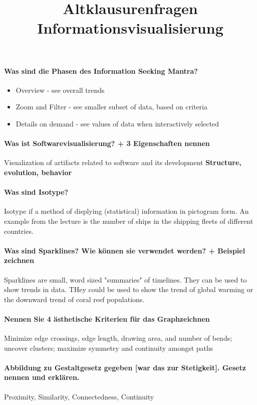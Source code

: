 \documentclass[10pt,a4paper]{article}
\title{Altklausurenfragen Informationsvisualisierung}
\begin{document}
	\maketitle
	\paragraph{Was sind die Phasen des Information Seeking Mantra?}
	\begin{itemize}
		\item Overview - see overall trends
		\item Zoom and Filter - see smaller subset of data, based on criteria
		\item Details on demand - see values of data when interactively selected
	\end{itemize}
	
	\paragraph{Was ist Softwarevisualisierung? + 3 Eigenschaften nennen}
	Visualization of artifacts related to software and its development
	\textbf{Structure, evolution, behavior}
	
	\paragraph{Was sind Isotype?} Isotype if a method of displying (statistical) information in pictogram form. An example from the lecture is the number of ships in the shipping fleets of different countries.
	
	\paragraph{Was sind Sparklines? Wie können sie verwendet werden? + Beispiel zeichnen}
	Sparklines are small, word sized "summaries" of timelines. They can be used to show trends in data. THey could be used to show the trend of global warming or the downward trend of coral reef populations.
	
	\paragraph{Nennen Sie 4 ästhetische Kriterien für das Graphzeichnen}
	Minimize edge crossings, edge length, drawing area, and number of bends; uncover clusters; maximize symmetry and continuity amongst paths
	
	
	\paragraph{Abbildung zu Gestaltgesetz gegeben [war das zur Stetigkeit]. Gesetz nennen und erklären.} Proximity, Similarity, Connectedness, Continuity
\end{document}
